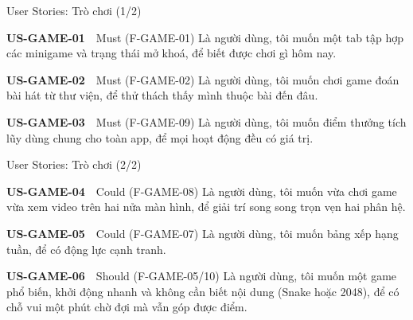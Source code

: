 \begin{frame}{User Stories: Trò chơi (1/2)}
\linespread{0.85}
\begin{block}{\scriptsize\bfseries US-GAME-01}~~Must \tiny(F-GAME-01)
{\scriptsize Là người dùng, tôi muốn một tab tập hợp các minigame và trạng thái mở khoá, để biết được chơi gì hôm nay.}
\end{block}
\vspace{1pt}
\begin{block}{\scriptsize\bfseries US-GAME-02}~~Must \tiny(F-GAME-02)
{\scriptsize Là người dùng, tôi muốn chơi game đoán bài hát từ thư viện, để thử thách thấy mình thuộc bài đến đâu.}
\end{block}
\vspace{1pt}
\begin{block}{\scriptsize\bfseries US-GAME-03}~~Must \tiny(F-GAME-09)
{\scriptsize Là người dùng, tôi muốn điểm thưởng tích lũy dùng chung cho toàn app, để mọi hoạt động đều có giá trị.}
\end{block}
\vspace{1pt}
\end{frame}

\begin{frame}{User Stories: Trò chơi (2/2)}
\linespread{0.85}
\begin{block}{\scriptsize\bfseries US-GAME-04}~~Could \tiny(F-GAME-08)
{\scriptsize Là người dùng, tôi muốn vừa chơi game vừa xem video trên hai nửa màn hình, để giải trí song song trọn vẹn hai phân hệ.}
\end{block}
\vspace{1pt}
\begin{block}{\scriptsize\bfseries US-GAME-05}~~Could \tiny(F-GAME-07)
{\scriptsize Là người dùng, tôi muốn bảng xếp hạng tuần, để có động lực cạnh tranh.}
\end{block}
\vspace{1pt}
\begin{block}{\scriptsize\bfseries US-GAME-06}~~Should \tiny(F-GAME-05/10)
{\scriptsize Là người dùng, tôi muốn một game phổ biến, khởi động nhanh và không cần biết nội dung (Snake hoặc 2048), để có chỗ vui một phút chờ đợi mà vẫn góp được điểm.}
\end{block}
\vspace{1pt}
\end{frame}

